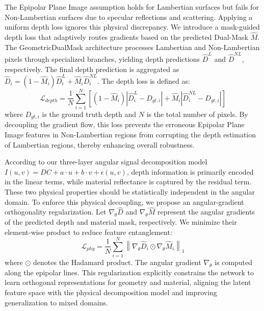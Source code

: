 The Epipolar Plane Image assumption holds for Lambertian surfaces but fails for Non-Lambertian surfaces due to specular reflections and scattering. Applying a uniform depth loss ignores this physical discrepancy. We introduce a mask-guided depth loss that adaptively routes gradients based on the predicted Dual-Mask $\hat{M}$. The GeometricDualMask architecture processes Lambertian and Non-Lambertian pixels through specialized branches, yielding depth predictions $\hat{D}^L$ and $\hat{D}^{NL}$, respectively. The final depth prediction is aggregated as $\hat{D}_i = (1 - \hat{M}_i)\hat{D}^L_i + \hat{M}_i\hat{D}^{NL}_i$. The depth loss is defined as:
\begin{equation}
\label{eq:eq24}
\mathcal{L}_{depth} = \frac{1}{N} \sum_{i=1}^{N} \left[ (1 - \hat{M}_i) \left| \hat{D}^L_i - D_{gt, i} \right| + \hat{M}_i \left| \hat{D}^{NL}_i - D_{gt, i} \right| \right]
\end{equation}
where $D_{gt, i}$ is the ground truth depth and $N$ is the total number of pixels. By decoupling the gradient flow, this loss prevents the erroneous Epipolar Plane Image features in Non-Lambertian regions from corrupting the depth estimation of Lambertian regions, thereby enhancing overall robustness.

According to our three-layer angular signal decomposition model $I(u,v) = DC + a\cdot u + b\cdot v + \epsilon(u,v)$, depth information is primarily encoded in the linear terms, while material reflectance is captured by the residual term. These two physical properties should be statistically independent in the angular domain. To enforce this physical decoupling, we propose an angular-gradient orthogonality regularization. Let $\nabla_{\theta} \hat{D}$ and $\nabla_{\theta} \hat{M}$ represent the angular gradients of the predicted depth and material mask, respectively. We minimize their element-wise product to reduce feature entanglement:
\begin{equation}
\label{eq:eq25}
\mathcal{L}_{phy} = \frac{1}{N} \sum_{i=1}^{N} \left\| \nabla_{\theta} \hat{D}_i \odot \nabla_{\theta} \hat{M}_i \right\|_1
\end{equation}
where $\odot$ denotes the Hadamard product. The angular gradient $\nabla_{\theta}$ is computed along the epipolar lines. This regularization explicitly constrains the network to learn orthogonal representations for geometry and material, aligning the latent feature space with the physical decomposition model and improving generalization to mixed domains.

